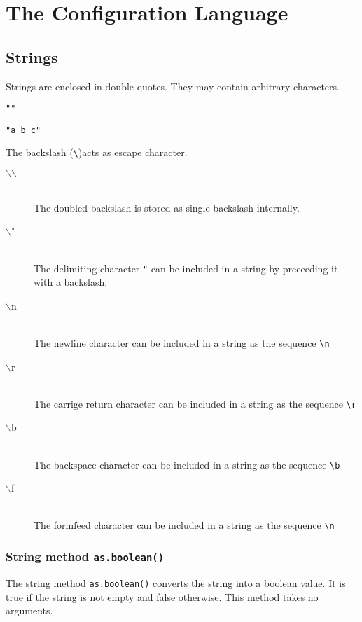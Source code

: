 \documentclass[11pt,a4paper]{scrbook}
\newcommand\BS{\(\backslash\)}
\begin{document}

\chapter{The  Configuration Language}

\section{Strings}

Strings are enclosed in double quotes. They may contain arbitrary characters.

\begin{lstlisting}[language=BibTool]
""
\end{lstlisting}

\begin{lstlisting}[language=BibTool]
"a b c"
\end{lstlisting}

The backslash (\verb|\|)acts as escape character.
\begin{description}
\item [\BS\BS] \ \\The doubled backslash is stored as single backslash
  internally.
\item [\BS "] \ \\The delimiting character \verb|"| can be included in a
  string by preceeding it with a backslash.
\item [\BS n] \ \\The newline character can be included in a string as the
  sequence \verb|\n|
\item [\BS r] \ \\The carrige return character can be included in a string as
  the sequence \verb|\r|
\item [\BS b] \ \\The backspace character can be included in a string as the
  sequence \verb|\b|
\item [\BS f] \ \\The formfeed character can be included in a string as the
  sequence \verb|\n|
\end{description}


\subsection{String method \texttt{as.boolean()}}

The string method \texttt{as.boolean()} converts the string into a boolean
value. It is true if the string is not empty and false otherwise. This method
takes no arguments.
\end{document}
